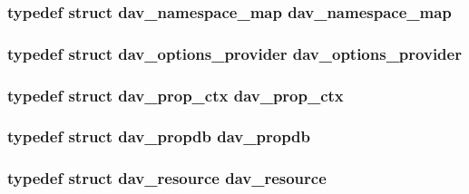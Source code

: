 \subsubsection[{\texorpdfstring{dav\+\_\+namespace\+\_\+map}{dav_namespace_map}}]{\setlength{\rightskip}{0pt plus 5cm}typedef struct {\bf dav\+\_\+namespace\+\_\+map} {\bf dav\+\_\+namespace\+\_\+map}}\hypertarget{group__MOD__DAV_gacd79bb3e59ca44135b1037d2e0aa5f29}{}\label{group__MOD__DAV_gacd79bb3e59ca44135b1037d2e0aa5f29}
\subsubsection[{\texorpdfstring{dav\+\_\+options\+\_\+provider}{dav_options_provider}}]{\setlength{\rightskip}{0pt plus 5cm}typedef struct {\bf dav\+\_\+options\+\_\+provider}  {\bf dav\+\_\+options\+\_\+provider}}\hypertarget{group__MOD__DAV_ga3f9bbd119abc8278c7f006e4bb9d95be}{}\label{group__MOD__DAV_ga3f9bbd119abc8278c7f006e4bb9d95be}
\subsubsection[{\texorpdfstring{dav\+\_\+prop\+\_\+ctx}{dav_prop_ctx}}]{\setlength{\rightskip}{0pt plus 5cm}typedef struct {\bf dav\+\_\+prop\+\_\+ctx}  {\bf dav\+\_\+prop\+\_\+ctx}}\hypertarget{group__MOD__DAV_ga39282b6c6448d23b49791867f63aed77}{}\label{group__MOD__DAV_ga39282b6c6448d23b49791867f63aed77}
\subsubsection[{\texorpdfstring{dav\+\_\+propdb}{dav_propdb}}]{\setlength{\rightskip}{0pt plus 5cm}typedef struct {\bf dav\+\_\+propdb} {\bf dav\+\_\+propdb}}\hypertarget{group__MOD__DAV_ga3950a19aee33c6595720afb0b42dfb46}{}\label{group__MOD__DAV_ga3950a19aee33c6595720afb0b42dfb46}
\subsubsection[{\texorpdfstring{dav\+\_\+resource}{dav_resource}}]{\setlength{\rightskip}{0pt plus 5cm}typedef struct {\bf dav\+\_\+resource}  {\bf dav\+\_\+resource}}\hypertarget{group__MOD__DAV_ga3c6a9bf4a34a360a07f269dc4aa783e2}{}\label{group__MOD__DAV_ga3c6a9bf4a34a360a07f269dc4aa783e2}
